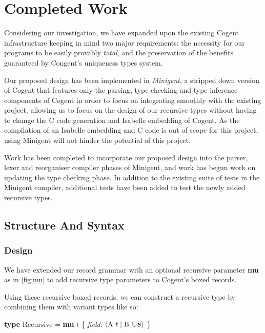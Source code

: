 \chapter{Completed Work}\label{ch:style}

Considering our investigation, we have expanded upon the existing Cogent infrastructure keeping in mind
two major requirements: the necessity for our programs to be easily provably \textit{total},
and the preservation of the benefits guaranteed by Congent's uniqueness types system.

Our proposed design has been implemented in \textit{Minigent}, a stripped down version of Cogent that
features only the parsing, type checking and type inference components of Cogent in order to
focus on integrating smoothly with the existing project, allowing us to focus on the design
of our recursive types without having to change the C code generation and Isabelle embedding of Cogent.
As the compilation of an Isabelle embedding and C code is out of scope for this project,
using Minigent will not hinder the potential of this project.

Work has been completed to incorporate our proposed design into the parser, lexer and reorganiser compiler phases of
Minigent, and work has begun work on updating the type checking phase.
In addition to the existing suite of tests in the Minigent compiler, additional tests have 
been added to test the newly added recursive types.

\section{Structure And Syntax}

\subsection{Design}

We have extended our record grammar with an optional recursive parameter \textbf{mu} as in \autoref{fig:mu} to add 
recursive type parameters to Cogent's boxed records.

Using these recursive boxed records, we can construct a recursive type by combining them with variant types like so: \\

\begin{center}
    \textbf{type} Recursive = \textbf{mu} $t$ \{ \textit{field}: $\langle \text{A } t\; |\; \text{B } \textsc{U8} \rangle$ \}
\end{center}

